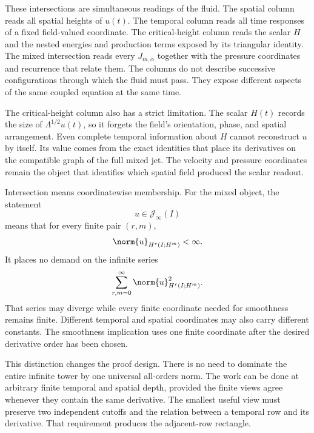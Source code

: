 These intersections are simultaneous readings of the fluid.
The spatial column reads all spatial heights of \(u(t)\).
The temporal column reads all time responses of a fixed field-valued coordinate.
The critical-height column reads the scalar \(H\) and the nested energies and production terms exposed by its triangular identity.
The mixed intersection reads every \(J_{m,\alpha}\) together with the pressure coordinates and recurrence that relate them.
The columns do not describe successive configurations through which the fluid must pass.
They expose different aspects of the same coupled equation at the same time.

The critical-height column also has a strict limitation.
The scalar \(H(t)\) records the size of \(\Lambda^{1/2}u(t)\), so it forgets the field's orientation, phase, and spatial arrangement.
Even complete temporal information about \(H\) cannot reconstruct \(u\) by itself.
Its value comes from the exact identities that place its derivatives on the compatible graph of the full mixed jet.
The velocity and pressure coordinates remain the object that identifies which spatial field produced the scalar readout.

Intersection means coordinatewise membership.
For the mixed object, the statement
\[
  u\in\mathscr J_\infty(I)
\]
means that for every finite pair \((r,m)\),
\[
  \norm{u}_{H^r(I;H^m)}<\infty.
\]
It places no demand on the infinite series
\[
  \sum_{r,m=0}^{\infty}
  \norm{u}_{H^r(I;H^m)}^2.
\]
That series may diverge while every finite coordinate needed for smoothness remains finite.
Different temporal and spatial coordinates may also carry different constants.
The smoothness implication uses one finite coordinate after the desired derivative order has been chosen.

This distinction changes the proof design.
There is no need to dominate the entire infinite tower by one universal all-orders norm.
The work can be done at arbitrary finite temporal and spatial depth, provided the finite views agree whenever they contain the same derivative.
The smallest useful view must preserve two independent cutoffs and the relation between a temporal row and its derivative.
That requirement produces the adjacent-row rectangle.
